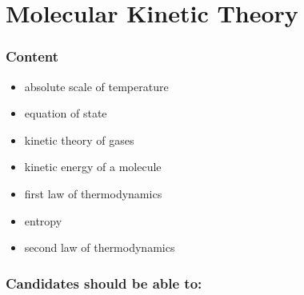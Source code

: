 \documentclass[main.tex]{subfiles}
\begin{document}
\chapter{Molecular Kinetic Theory}
\subsection{Content}
\begin{itemize}
\item absolute scale of temperature
\item equation of state
\item kinetic theory of gases
\item kinetic energy of a molecule
\item first law of thermodynamics
\item entropy
\item second law of thermodynamics
\end{itemize}

\subsection{Candidates should be able to:}

\end{document}
